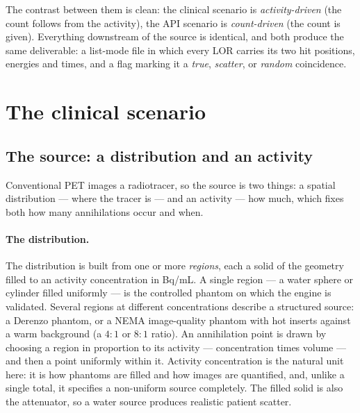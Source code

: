 \documentclass[11pt]{article}
\begin{document}
The contrast between them is clean: the clinical scenario is \emph{activity-driven} (the count
follows from the activity), the API scenario is \emph{count-driven} (the count is given). Everything
downstream of the source is identical, and both produce the same deliverable: a list-mode file in
which every LOR carries its two hit positions, energies and times, and a flag marking it a
\emph{true}, \emph{scatter}, or \emph{random} coincidence.

\section{The clinical scenario}
\label{sec:clinical}

\subsection{The source: a distribution and an activity}

Conventional PET images a radiotracer, so the source is two things: a spatial distribution --- where
the tracer is --- and an activity --- how much, which fixes both how many annihilations occur and
when.

\paragraph{The distribution.} The distribution is built from one or more \emph{regions}, each a solid
of the geometry filled to an activity concentration in \si{Bq/mL}. A single region --- a water sphere
or cylinder filled uniformly --- is the controlled phantom on which the engine is validated. Several
regions at different concentrations describe a structured source: a Derenzo phantom, or a NEMA
image-quality phantom with hot inserts against a warm background (a $4{:}1$ or $8{:}1$ ratio). An
annihilation point is drawn by choosing a region in proportion to its activity --- concentration
times volume --- and then a point uniformly within it. Activity concentration is the natural unit
here: it is how phantoms are filled and how images are quantified, and, unlike a single total, it
specifies a non-uniform source completely. The filled solid is also the attenuator, so a water source
produces realistic patient scatter.
\end{document}
